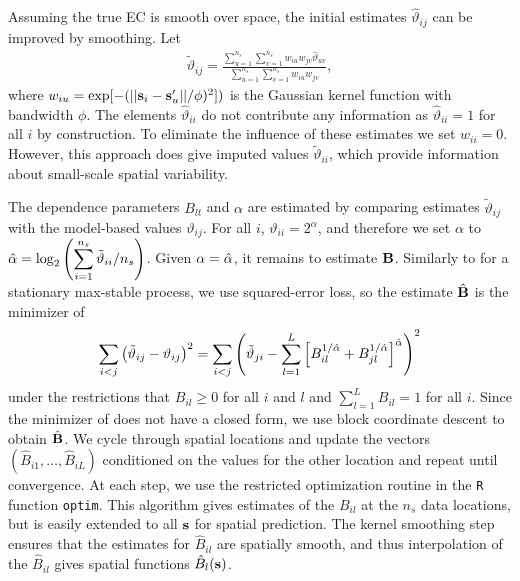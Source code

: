 Assuming the true EC is smooth over space, the initial estimates ${\hat \vartheta}_{ij}$ can be improved by smoothing.
Let
\begin{align} \label{ebeq:EChat2}
  {\tilde \vartheta}_{ij} = \frac{\displaystyle \sum_{u=1}^{n_s}\sum_{v=1}^{n_s} w_{iu}w_{jv}{\hat \vartheta}_{uv}}
  {\displaystyle \sum_{u=1}^{n_s}\sum_{v=1}^{n_s} w_{iu}w_{jv}},
\end{align}
where $w_{iu} = \exp[-(||\mathbf{s}_i-\mathbf{s}_u'||/\phi)^2])$ is the Gaussian kernel function with bandwidth $\phi$.
The elements ${\hat \vartheta}_{ii}$ do not contribute any information as ${\hat \vartheta}_{ii}=1$ for all $i$ by construction.
To eliminate the influence of these estimates we set $w_{ii}=0$.
However, this approach does give imputed values ${\tilde \vartheta}_{ii}$, which provide information about small-scale spatial variability.

The dependence parameters $B_{lt}$ and $\alpha$ are estimated by comparing estimates ${\tilde \vartheta}_{ij}$ with the model-based values $\vartheta_{ij}$.
For all $i$, $\vartheta_{ii} = 2^{\alpha}$, and therefore we set $\alpha$ to $\hat{\alpha} = \log_2\left(\displaystyle \sum_{i=1}^{n_s}{\tilde \vartheta}_{ii}/n_s\right)$.
Given $\alpha=\hat{\alpha}$, it remains to estimate $\mathbf{B}$.
Similarly to \citet{Smith1990} for a stationary max-stable process, we use squared-error loss, so the estimate $\hat{\mathbf{B}}$ is the minimizer of
\begin{align} \label{ebeq:Bhat}
\sum_{i<j} \left({\tilde \vartheta}_{ij} - \vartheta_{ij}\right)^2
  =
  \sum_{i<j} \left({\tilde \vartheta}_{ji} - \sum_{l=1}^L \left[B_{il}^{1/\hat{\alpha}} + B_{jl}^{1/\hat{\alpha}} \right]^{\hat{\alpha}}\right)^2
\end{align}
under the restrictions that $B_{il}\ge 0$ for all $i$ and $l$ and $\displaystyle \sum_{l=1}^LB_{il}=1$ for all $i$.
Since the minimizer of  does not have a closed form, we use block coordinate descent to obtain ${\hat {\mathbf{B}}}$.
We cycle through spatial locations and update the vectors $\left(\hat{B}_{i1},\ldots,\hat{B}_{iL}\right)$ conditioned on the values for the other location and repeat until convergence.
At each step, we use the restricted optimization routine in the \texttt{R} function \texttt{optim}.
This algorithm gives estimates of the $B_{il}$ at the $n_s$ data locations, but is easily extended to all $\mathbf{s}$ for spatial prediction.
The kernel smoothing step ensures that the estimates for $\hat{B}_{il}$ are spatially smooth, and thus interpolation of the $\hat{B}_{il}$ gives spatial functions $\hat{B}_l(\mathbf{s})$.

